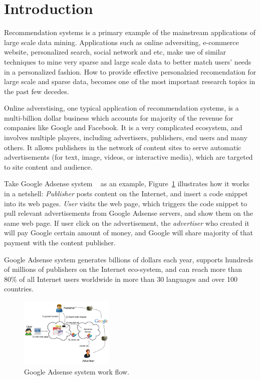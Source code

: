 \section{Introduction}
\label{sec:intro}

Recommendation systems is a primary example of the mainstream
applications of large scale data mining.  Applications such as online
adversiting, e-commerce website, personalized search, social network
and etc, make use of similar techniques to mine very sparse and large
scale data to better match users’ needs in a personalized fashion.
How to provide effective personalzied recomendation for large scale
and sparse data, becomes one of the most important research topics in
the past few decedes.


Online adverstising, one typical application of recommendation
systems, is a multi-billion dollar business which accounts for
majority of the revenue for companies like Google and Facebook. It is
a very complicated ecosystem, and involves multiple players, including
advertisers, publishers, end users and many others.  It allows
publishers in the network of content sites to serve automatic
advertisements (for text, image, videos, or interactive media), which
are targeted to site content and audience.

Take Google Adsense system ~\cite{adsense:wiki} as an example,
Figure~\ref{fig:adsense} illustrates how it works in a netshell: {\em
  Publisher} posts content on the Internet, and insert a code snippet
into its web pages. {\em User} visits the web page, which triggers the
code snippet to pull relevant advertisements from Google Adsense
servers, and show them on the same web page.  If user click on the
advertisement, the {\em advertiser} who created it will pay Google
certain amount of money, and Google will share majority of that
payment with the content publisher.

Google Adsense system generates billions of dollars each year,
supports hundreds of millions of publishers on the Internet
eco-system, and can reach more than 80\% of all Internet users
worldwide in more than 30 languages and over 100 countries.

\begin{figure}[!ht]
  \centering
  \includegraphics[width=0.4\textwidth]{figures/adsense.jpg}
  \caption{Google Adsense system work flow.}
  \label{fig:adsense}
\end{figure}

